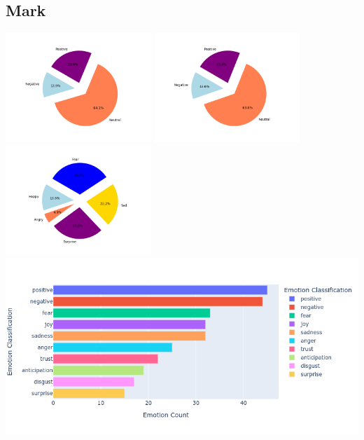 \documentclass[a4paper,12pt]{article}
\begin{document}
	\subsection{Mark}
	\begin{center}
		{\includegraphics[width=5.5cm]{marksVaderEmotionalPie.png}}
		{\includegraphics[width=5.5cm]{marksBlobEmotionalPie.png}}
		{\includegraphics[width=5.5cm]{marksEmotionalPie.png}}\\
		{\includegraphics[width=16cm]{markNrcImage.png}}\\
	\end{center}
	\clearpage
\end{document}
